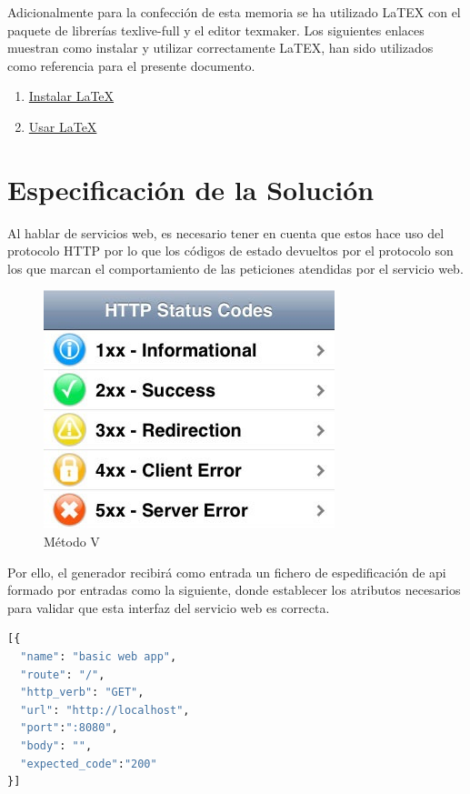 \documentclass[a4paper,11pt]{book}
\begin{document}
Adicionalmente para la confección de esta memoria se ha utilizado LaTEX con el paquete de librerías texlive-full y el editor texmaker. Los siguientes enlaces muestran como instalar y utilizar correctamente LaTEX, han sido utilizados como referencia para el presente documento. 

\begin{enumerate}
\item \href{http://milq.github.io/install-latex-ubuntu-debian/}{Instalar LaTeX}
\item \href{ http://minisconlatex.blogspot.com.es/}{Usar LaTeX}
\end{enumerate}
 
\section{Especificación de la Solución}

Al hablar de servicios web, es necesario tener en cuenta que estos hace uso del protocolo HTTP por lo que los códigos de estado devueltos por el protocolo son los que marcan el comportamiento de las peticiones atendidas por el servicio web. 

\begin{figure}[H]  
\centering 
\includegraphics[scale=0.35]{imagenes/http.jpg}
\caption{ Método V }  
\end{figure}

Por ello, el generador recibirá como entrada un fichero de espedificación de api formado por entradas como la siguiente, donde establecer los atributos necesarios para validar que esta interfaz del servicio web es correcta. 

\begin{lstlisting}[language=python,caption={ Entrada Unitaria Configuración Generador }]
[{
  "name": "basic web app",
  "route": "/",
  "http_verb": "GET",
  "url": "http://localhost",
  "port":":8080",
  "body": "",
  "expected_code":"200"
}]

\end{lstlisting}
\end{document}
